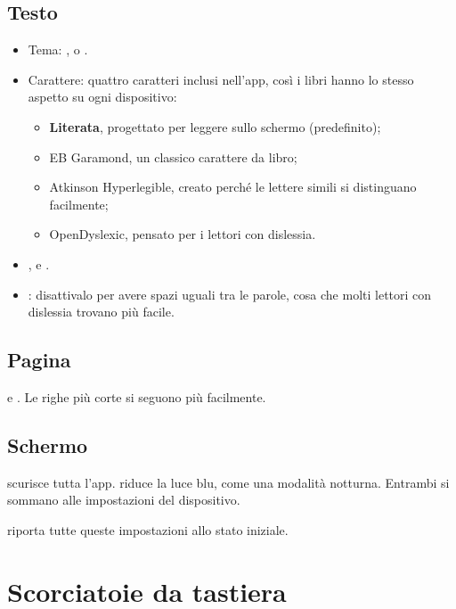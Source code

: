 \documentclass[11pt]{article}
\begin{document}
\subsection{Testo}
\begin{itemize}
  \item Tema: ,  o .
  \item Carattere: quattro caratteri inclusi nell’app, così i libri hanno lo stesso aspetto su ogni
        dispositivo:
  \begin{itemize}
    \item \textbf{Literata}, progettato per leggere sullo schermo (predefinito);
    \item {\garamondfont EB Garamond}, un classico carattere da libro;
    \item {\sffamily Atkinson Hyperlegible}, creato perché le lettere simili si distinguano
          facilmente;
    \item {\dyslexicfont OpenDyslexic}, pensato per i lettori con dislessia.
  \end{itemize}
  \item {},  e .
  \item {}: disattivalo per avere spazi uguali tra le parole, cosa che molti
        lettori con dislessia trovano più facile.
\end{itemize}

\subsection{Pagina}
 e . Le righe più corte si seguono più facilmente.

\subsection{Schermo}
 scurisce tutta l’app.  riduce la luce blu, come una modalità notturna.
Entrambi si sommano alle impostazioni del dispositivo.

 riporta tutte queste impostazioni allo stato iniziale.

\section{Scorciatoie da tastiera}
\end{document}
